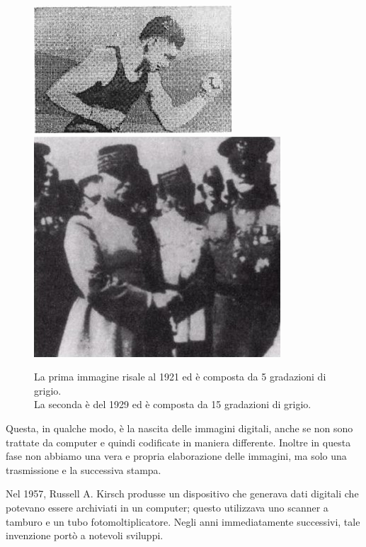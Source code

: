 \begin{figure}[htb] \centering
\includegraphics[scale=0.5, trim = 0 1.1cm 0 0, clip]{Pictures/img del 1921 a 5 gradazioni di grigio.jpg}
\qquad\qquad
\includegraphics[scale=1.7, trim = 0 1.1cm 0 0, clip]{Pictures/img del 1929 a 15 gradazioni di grigio.jpg}
\caption{La prima immagine risale al 1921 ed è composta da 5 gradazioni di grigio.\\ 
La seconda è del 1929 ed è composta da 15 gradazioni di grigio. \cite{storia} }\label{fig:figura}
\end{figure}
\noindent
Questa, in qualche modo, è la nascita delle immagini digitali, anche se non sono trattate da computer e quindi codificate in maniera differente. Inoltre in questa fase non abbiamo una vera e propria elaborazione delle immagini, ma solo una trasmissione e la successiva stampa.

\vspace{1em} \noindent
Nel 1957, Russell A. Kirsch produsse un dispositivo che generava dati digitali che potevano essere archiviati in un computer; questo utilizzava uno scanner a tamburo e un tubo fotomoltiplicatore. Negli anni immediatamente successivi, tale invenzione portò a notevoli sviluppi.


